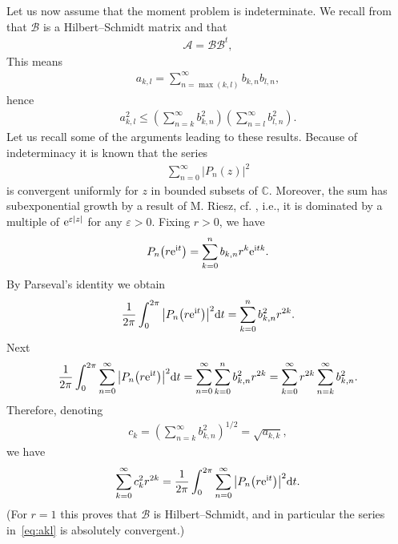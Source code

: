 \documentclass[pdftex]{sigma}
\numberwithin{equation}{section}
\begin{document}
Let us now assume that the moment problem is indeterminate. We recall from \cite[Proposition~4.2]{B:S1} that $\mathcal B$ is a Hilbert--Schmidt matrix and that \begin{gather}\label{eq:A=BBt}
\mathcal{A}=\mathcal B\mathcal B^t,
\end{gather}
 This means
\begin{gather}\label{eq:akl}
a_{k,l}=\sum^\infty_{n=\max(k,l)}b_{k,n}b_{l,n},
\end{gather}
hence
\begin{gather*}
a_{k,l}^2\le \left (\sum_{n=k}^\infty b_{k,n}^2\right ) \left (\sum_{n=l}^\infty b_{l,n}^2\right ).\end{gather*}
Let us recall some of the arguments leading to these results. Because of indeterminacy it
is known that the series
\begin{gather*}
\sum_{n=0}^\infty |P_n(z)|^2
\end{gather*}
 is convergent uniformly for $z$ in bounded subsets of $\mathbb{C}$. Moreover, the sum has subexponential growth by a result of M. Riesz, cf. \cite[p. 56]{Ak}, i.e., it is dominated by a multiple of ${\rm e}^{\varepsilon |z|}$ for any $\varepsilon>0$.
Fixing $r>0$, we have
\begin{gather*}
P_n\big(r{\rm e}^{{\rm i}t}\big)=\sum_{k=0}^n b_{k,n}r^k{\rm e}^{{\rm i}tk}.
\end{gather*}
By Parseval's identity we obtain
\begin{gather*}
{1\over 2\pi}\int_0^{2\pi}\big|P_n\big(r{\rm e}^{{\rm i}t}\big)\big|^2{\rm d}t = \sum_{k=0}^n b_{k,n}^2r^{2k}.
\end{gather*}
 Next
\begin{gather*}
{1\over 2\pi}\int_0^{2\pi}\sum_{n=0}^\infty \big|P_n\big(r{\rm e}^{{\rm i}t}\big)\big|^2{\rm d}t=\sum_{n=0}^\infty\sum_{k=0}^n b_{k,n}^2r^{2k}=\sum_{k=0}^\infty r^{2k}\sum_{n=k}^\infty b_{k,n}^2.
\end{gather*}
Therefore, denoting
\begin{gather}\label{eq:c_k}
c_k=\left (\sum_{n=k}^\infty b_{k,n}^2\right )^{1/2}=\sqrt{a_{k,k}},
\end{gather}
 we have
\begin{gather*}\label{eq:r}
\sum_{k=0}^\infty c_k^2r^{2k}={1\over 2\pi}\int_0^{2\pi}\sum_{n=0}^\infty \big|P_n\big(r{\rm e}^{{\rm i}t}\big)\big|^2{\rm d}t.
\end{gather*}
(For $r=1$ this proves that $\mathcal B$ is Hilbert--Schmidt, and in particular the series in~\eqref{eq:akl} is absolutely convergent.)
\end{document}
